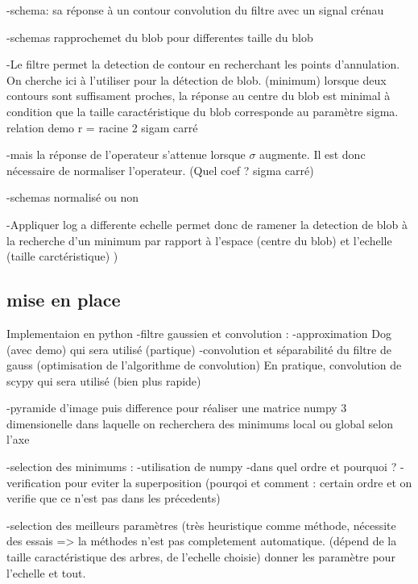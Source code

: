 \documentclass{article}
\begin{document}
		-schema: sa réponse à un contour
		convolution du filtre avec un signal crénau
		
		-schemas rapprochemet du blob pour differentes taille du blob 
		
		-Le filtre permet la detection de contour en recherchant les points d'annulation. On cherche ici à l'utiliser pour la détection de blob. (minimum) lorsque deux contours sont suffisament proches, la réponse au centre du blob est minimal à condition que la taille caractéristique du blob corresponde au paramètre sigma. relation demo r = racine 2 sigam carré 

		-mais la réponse de l'operateur s'attenue lorsque $\sigma$ augmente. Il est donc nécessaire de normaliser l'operateur. (Quel coef ? sigma carré) 
		
		-schemas normalisé ou non 

		-Appliquer log a differente echelle permet donc de ramener la detection de blob à la recherche d'un minimum par rapport à l'espace (centre du blob) et l'echelle (taille carctéristique) ) 


	\subsection{mise en place}
	Implementaion en python
		-filtre gaussien et convolution :	
			-approximation Dog (avec demo) qui sera utilisé (partique) 
			-convolution et séparabilité du filtre de gauss (optimisation de l'algorithme de convolution) En pratique, convolution de scypy qui sera utilisé (bien plus rapide)
	
		-pyramide d'image puis difference pour réaliser une matrice numpy 3 dimensionelle dans laquelle on recherchera des minimums local ou global selon l'axe
		
		-selection des minimums :
			-utilisation de numpy
			-dans quel ordre et pourquoi ?
			-verification pour eviter la superposition (pourqoi et comment : certain ordre et on verifie que ce n'est pas dans les précedents)
	
		-selection des meilleurs paramètres (très heuristique comme méthode, nécessite des essais => la méthodes n'est pas completement automatique. (dépend de la taille caractéristique des arbres, de l'echelle choisie) donner les paramètre pour l'echelle et tout.
\end{document}
